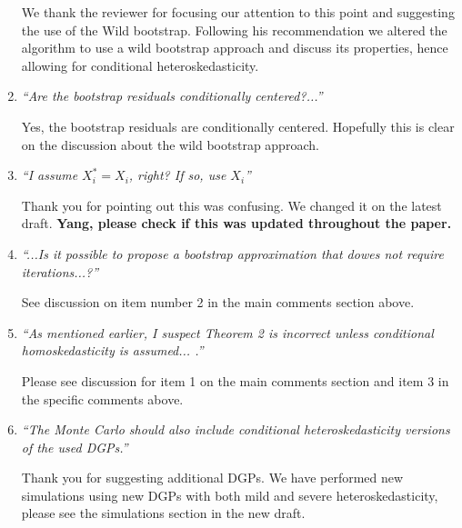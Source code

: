 \documentclass[12pt,fleqn]{article}
\begin{document}
\begin{enumerate}
 We thank the reviewer for focusing our attention to this point and suggesting the use of the Wild bootstrap. Following his recommendation we altered the algorithm to use a wild bootstrap approach and discuss its properties, hence allowing for conditional heteroskedasticity.

\item \textit{``Are the bootstrap residuals conditionally centered?...''}

 Yes, the bootstrap residuals are conditionally centered. Hopefully this is clear on the discussion about the wild bootstrap approach.

\item \textit{``I assume $X_{i}^{*}=X_{i}$, right? If so, use $X_{i}$''}

Thank you for pointing out this was confusing. We changed it on the latest draft. \textbf{Yang, please check if this was updated throughout the paper.}

\item \textit{``...Is it possible to propose a bootstrap approximation that dowes not require iterations...?''}

 See discussion on item number 2 in the main comments section above.

\item \textit{``As mentioned earlier, I suspect Theorem 2 is incorrect unless conditional homoskedasticity is assumed... .''}

  Please see discussion for item 1 on the main comments section and item 3 in the specific comments above.

\item \textit{``The Monte Carlo should also include conditional heteroskedasticity versions of the used DGPs.''}

  Thank you for suggesting additional DGPs. We have performed new simulations using new DGPs with both mild and severe heteroskedasticity, please see the simulations section in the new draft.

\end{enumerate}
\end{document}

